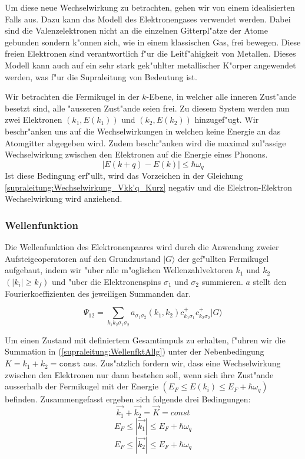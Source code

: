 \begin{refsection}
Um diese neue Wechselwirkung zu betrachten, gehen wir von einem idealisierten Falls aus.
Dazu kann das Modell des Elektronengases verwendet werden.
Dabei sind die Valenzelektronen nicht an die einzelnen Gitterpl"atze der Atome gebunden sondern k"onnen sich,
wie in einem klassischen Gas, frei bewegen.
Diese freien Elektronen sind verantwortlich f"ur die Leitf"ahigkeit von Metallen.
Dieses Modell kann auch auf ein sehr stark gek"uhlter metallischer K"orper angewendet werden,
was f"ur die Supraleitung von Bedeutung ist.

Wir betrachten die Fermikugel in der $k$-Ebene, in welcher alle inneren Zust"ande besetzt sind,
alle "ausseren Zust"ande seien frei.
Zu diesem System werden nun zwei Elektronen $(k_1,E(k_1))$ und $(k_2,E(k_2))$ hinzugef"ugt.
Wir beschr"anken uns auf die Wechselwirkungen in welchen keine Energie an das Atomgitter abgegeben wird.
Zudem beschr"anken wird die maximal zul"assige Wechselwirkung zwischen den Elektronen auf die
Energie eines Phonons.
\begin{equation}
|E(k+q)-E(k)|\le\hbar\omega_q
\label{supraleitung:Phonon Energie}
\end{equation}
Ist diese Bedingung erf"ullt, wird das Vorzeichen in der Gleichung \ref{supraleitung:Wechselwirkung_Vkk'q_Kurz} negativ und die Elektron-Elektron Wechselwirkung wird anziehend.

\subsubsection{Wellenfunktion}
Die Wellenfunktion des Elektronenpaares wird durch die Anwendung zweier Aufsteigeoperatoren
auf den Grundzustand $|G\rangle$ der gef"ullten Fermikugel aufgebaut, indem wir "uber
alle m"oglichen Wellenzahlvektoren $k_1$ und $k_2$ $(|k_i| \ge k_f)$ und "uber
die Elektronenspins $\sigma_1$ und $\sigma_2$ summieren.
$a$ stellt den Fourierkoeffizienten des jeweiligen Summanden dar.

\begin{equation}
\Psi_{12}=\sum \limits_{k_1k_2\sigma_1\sigma_2} a_{\sigma_1\sigma_2}
(k_1,k_2)c^+_{k_1\sigma_1}c^+_{k_2\sigma_2}|G\rangle
\label{supraleitung:WellenfktAllg}
\end{equation}

Um einen Zustand mit definiertem Gesamtimpuls zu erhalten, f"uhren wir die Summation in
(\ref{supraleitung:WellenfktAllg}) unter der Nebenbedingung $K=k_1+k_2=\texttt{const}$ aus.
Zus"atzlich fordern wir, dass eine Wechselwirkung zwischen den Elektronen nur dann bestehen soll,
wenn sich ihre Zust"ande ausserhalb der Fermikugel mit der Energie
$(E_F \le E(k_i) \le E_F+\hbar\omega_q)$ befinden.
Zusammengefasst ergeben sich folgende drei Bedingungen:
\[
\overrightarrow{k_1}+\overrightarrow{k_2}=\overrightarrow{K}=const
\]
\[
E_F\le|\overrightarrow{k_1}|\le E_F+\hbar\omega_q
\]
\[
E_F\le|\overrightarrow{k_2}|\le E_F+\hbar\omega_q
\]

\end{refsection}
